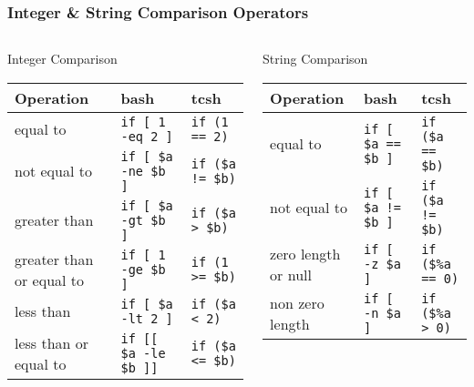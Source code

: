 \documentclass[slidestop,mathserif,compress,xcolor=svgnames]{beamer}
\newenvironment{eblock}[0]
{
\begin{beamerboxesrounded}[upper=uppercol2,lower=lowercol2,shadow=true]}
{\end{beamerboxesrounded}}
\begin{document}
\begin{frame}
  \frametitle{\small Integer \& String Comparison Operators}
  \begin{columns}
    \column{\textwidth}
    \vspace{-0.5cm}
    \begin{eblock}{Integer Comparison}
      \begin{tabular}{lll}
        Operation & \textbf{bash} & \textbf{tcsh} \\
        \hline
        equal to & \texttt{if [ 1 -eq 2 ]} & \texttt{if (1 == 2)} \\
        not equal to & \texttt{if [ \$a -ne \$b ]} & \texttt{if (\$a != \$b)}\\
        greater than & \texttt{if [ \$a -gt \$b ]} & \texttt{if (\$a > \$b)}\\
        greater than or equal to & \texttt{if [ 1 -ge \$b ]} & \texttt{if (1 >= \$b)}\\
        less than & \texttt{if [ \$a -lt 2 ]} & \texttt{if (\$a < 2)}\\
        less than or equal to & \texttt{if [[ \$a -le \$b ]]} & \texttt{if (\$a <= \$b)} \\
        \hline
      \end{tabular}
    \end{eblock}
    \begin{eblock}{String Comparison}
      \begin{tabular}{lll}
        Operation & \textbf{bash} & \textbf{tcsh} \\
        \hline
        equal to & \texttt{if [ \$a == \$b ]} & \texttt{if (\$a == \$b)}\\
        not equal to & \texttt{if [ \$a != \$b ]} & \texttt{if (\$a != \$b)}\\
        zero length or null & \texttt{if [ -z \$a ] } & \texttt{if (\$\%a == 0)}\\
        non zero length & \texttt{if [ -n \$a ] } & \texttt{if (\$\%a > 0)}\\
        \hline
      \end{tabular}
    \end{eblock}
  \end{columns}
\end{frame}

%
%
\end{document}
